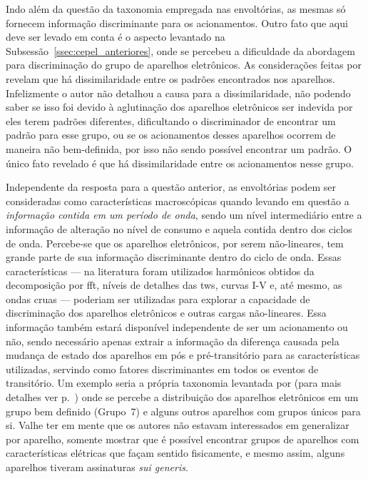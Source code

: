 Indo além da questão da taxonomia empregada nas envoltórias, as mesmas 
só fornecem informação discriminante para os acionamentos. Outro fato que
aqui deve ser levado em conta é o aspecto levantado na
Subsessão~\ref{ssec:cepel_anteriores}, onde se percebeu a dificuldade
da abordagem para discriminação do grupo de aparelhos eletrônicos.
As considerações feitas por \citeauthor*{nilm_cepel_alvaro} revelam
que há dissimilaridade entre os padrões encontrados nos aparelhos.
Infelizmente o autor não detalhou a causa para a dissimilaridade, não
podendo saber se isso foi devido à aglutinação dos aparelhos
eletrônicos ser indevida por eles terem padrões diferentes, dificultando o
discriminador de encontrar um padrão para esse grupo, ou se os
acionamentos desses aparelhos ocorrem de maneira não bem-definida, por
isso não sendo possível encontrar um padrão. O único fato revelado é
que há dissimilaridade entre os acionamentos nesse grupo.

Independente da resposta para a questão anterior, as envoltórias podem
ser consideradas como características macroscópicas quando levando em
questão a \emph{informação contida em um período de onda}, sendo um nível
intermediário entre a informação de alteração no nível de consumo e
aquela contida dentro dos ciclos de onda. Percebe-se que os aparelhos
eletrônicos, por serem não-lineares, tem grande parte de sua
informação discriminante dentro do ciclo de onda. Essas
características --- na literatura foram utilizados harmônicos obtidos da
decomposição por \gls{fft}, níveis de detalhes das \glspl{tw}, curvas
I-V e, até mesmo, as ondas cruas --- poderiam ser utilizadas para
explorar a capacidade de discriminação dos aparelhos eletrônicos e
outras cargas não-lineares. Essa informação também estará disponível
independente de ser um acionamento ou não, sendo
necessário apenas extrair a informação da diferença causada pela
mudança de estado dos aparelhos em pós e pré-transitório para as
características utilizadas, servindo como fatores discriminantes em
todos os eventos de transitório. Um exemplo seria a própria taxonomia
levantada por \citet{nilm_lam_2007_33} (para mais detalhes ver
p.~\pageref{nilm:curvas_iv}) onde se percebe a distribuição dos
aparelhos eletrônicos em um grupo bem definido (Grupo~7) e alguns
outros aparelhos com grupos únicos para si. Valhe ter em mente que os
autores não estavam interessados em generalizar por aparelho, somente
mostrar que é possível encontrar grupos de aparelhos com
características elétricas que façam sentido fisicamente, e mesmo
assim, alguns aparelhos tiveram assinaturas \emph{sui generis}.

